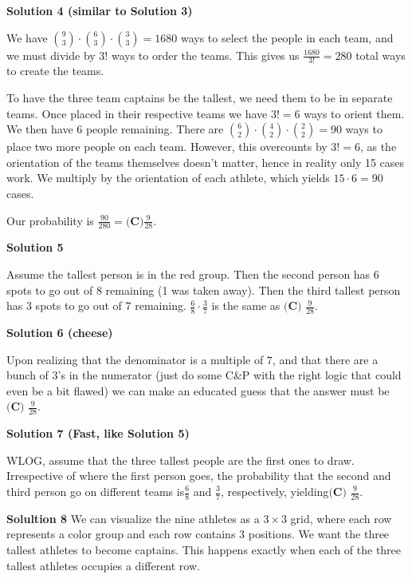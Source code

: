 \begin{enumerate}
\textbf{Solution 4 (similar to Solution 3)}

We have $\binom{9}{3}\cdot \binom{6}{3}\cdot \binom{3}{3}=1680$ ways to select the people in each team, and we must divide by $3!$ ways to order the teams. This gives us $\frac{1680}{3!}=280$ total ways to create the teams.

 To have the three team captains be the tallest, we need them to be in separate teams. Once placed in their respective teams we have $3! = 6$ ways to orient them.  We then have 6 people remaining. There are $\binom{6}{2}\cdot \binom{4}{2}\cdot \binom{2}{2} = 90$ ways to place two more people on each team. However, this overcounts by $3!=6$, as the orientation of the teams themselves doesn't matter, hence in reality only 15 cases work. We multiply by the orientation of each athlete, which yields $15 \cdot 6 = 90$ cases.

 Our probability is $\frac{90}{280} = \boxed{\textbf{(C)} \frac{9}{28}}$.

 



\textbf{Solution 5}

Assume the tallest person is in the red group. Then the second person has 6 spots to go out of 8 remaining (1 was taken away). Then the third tallest person has 3 spots to go out of 7 remaining. $\frac{6}{8} \cdot \frac{3}{7}$ is the same as $\boxed{\textbf{(C) }\frac{9}{28}}.$




\textbf{Solution 6 (cheese)}

Upon realizing that the denominator is a multiple of $7$, and that there are a bunch of $3$'s in the numerator (just do some C&P with the right logic that could even be a bit flawed) we can make an educated guess that the answer must be $\boxed{\textbf{(C) }\frac{9}{28}}.$




\textbf{Solution 7 (Fast, like Solution 5)}

WLOG, assume that the three tallest people are the first ones to draw. Irrespective of where the first person goes, the probability that the second and third person go on different teams is$\frac{6}{8}$ and $\frac{3}{7}$, respectively, yielding$\boxed{\textbf{(C) }\frac{9}{28}}.$

 \textbf{Solultion 8} We can visualize the nine athletes as a $3 \times 3$ grid, where each row represents a color group and each row contains 3 positions. We want the three tallest athletes to become captains. This happens exactly when each of the three tallest athletes occupies a different row.


\end{enumerate}
